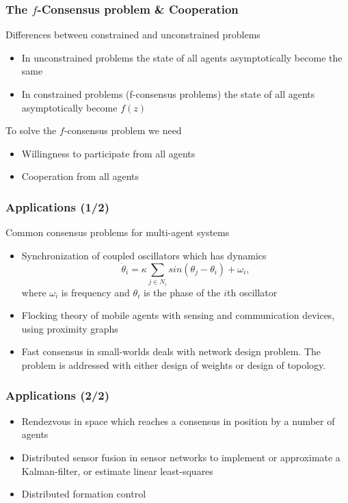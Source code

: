 \documentclass{beamer}
\begin{document}

\begin{frame}
\frametitle{The $f$-Consensus problem \& Cooperation}
Differences between constrained and unconstrained problems
\begin{itemize}
\item In unconstrained problems the state of all agents asymptotically become the same  
\item In constrained problems (f-consensus problems) the state of all agents asymptotically become $f(z)$ 
\end{itemize}
\vspace{0.2cm}
To solve the $f$-consensus problem we need 
\begin{itemize}
\item Willingness to participate from all agents
\item Cooperation from all agents
\end{itemize}
\end{frame}


\begin{frame}
\frametitle{Applications (1/2)}
Common consensus problems for multi-agent systems
\begin{itemize}
\item Synchronization of coupled oscillators which has dynamics
\begin{equation*}
\dot{\theta}_i = \kappa \sum_{j \in N_i}sin(\theta_j-\theta_i) + \omega_i,
\end{equation*}
where $\omega_i$ is frequency and $\theta_i$ is the phase of the $i$th oscillator
\item Flocking theory of mobile agents with sensing and communication devices, using proximity graphs
\item Fast consensus in small-worlds deals with network design problem. The problem is addressed with either design of weights or design of topology.
\end{itemize}
\end{frame}


\begin{frame}
\frametitle{Applications (2/2)}
\begin{itemize}
\item Rendezvous in space which reaches a consensus in position by a number of agents \vspace{.2cm}
\item Distributed sensor fusion in sensor networks to implement or approximate a Kalman-filter, or estimate linear least-squares \vspace{.2cm}
\item Distributed formation control
\end{itemize}
\end{frame}
\end{document}
